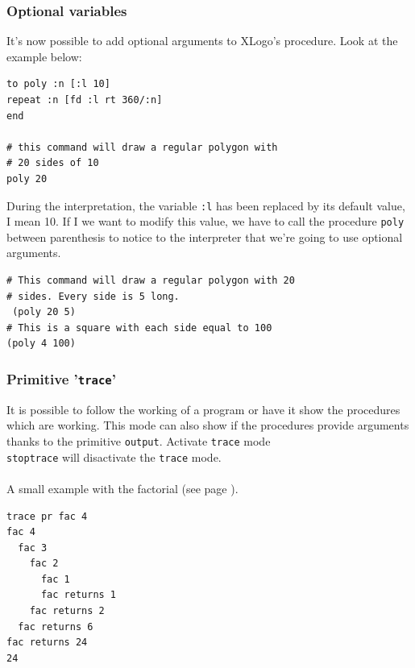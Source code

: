 \subsubsection{Optional variables}
It's now possible to add optional arguments to XLogo's procedure. Look at the example below:
\begin{verbatim}
to poly :n [:l 10]
repeat :n [fd :l rt 360/:n]
end

# this command will draw a regular polygon with 
# 20 sides of 10  
poly 20 
\end{verbatim}

During the interpretation, the variable \texttt{:l} has been replaced by its default value, I mean 10. If I we want to modify this value, we have to call the procedure \texttt{poly} between parenthesis to notice to the interpreter that we're going to use optional arguments.

\begin{verbatim}
# This command will draw a regular polygon with 20 
# sides. Every side is 5 long. 
 (poly 20 5)
# This is a square with each side equal to 100
(poly 4 100)
\end{verbatim}
\subsubsection{Primitive  '\texttt{trace}' }
It is possible to follow the working of a program or have it show the procedures which are working. This mode can also show if the procedures provide arguments thanks to the primitive \texttt{output}. 
Activate \texttt{trace} mode\\ 
\texttt{stoptrace}  will disactivate the \texttt{trace} mode. \\ \\
A small example with the factorial (see page \pageref{factorielle}).
\begin{verbatim}
trace pr fac 4
fac 4
  fac 3
    fac 2
      fac 1
      fac returns 1
    fac returns 2
  fac returns 6
fac returns 24
24
\end{verbatim}
